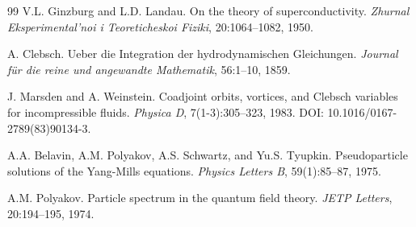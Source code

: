\documentclass[11pt,a4paper]{article}
\begin{document}
\begin{thebibliography}{99}
	V.L. Ginzburg and L.D. Landau.
	\newblock On the theory of superconductivity.
	\newblock \textit{Zhurnal Eksperimental'noi i Teoreticheskoi Fiziki}, 20:1064--1082, 1950.
	
	A. Clebsch.
	\newblock Ueber die Integration der hydrodynamischen Gleichungen.
	\newblock \textit{Journal für die reine und angewandte Mathematik}, 56:1--10, 1859.
	
	J. Marsden and A. Weinstein.
	\newblock Coadjoint orbits, vortices, and Clebsch variables for incompressible fluids.
	\newblock \textit{Physica D}, 7(1-3):305--323, 1983.
	\newblock DOI: 10.1016/0167-2789(83)90134-3.
	
	A.A. Belavin, A.M. Polyakov, A.S. Schwartz, and Yu.S. Tyupkin.
	\newblock Pseudoparticle solutions of the Yang-Mills equations.
	\newblock \textit{Physics Letters B}, 59(1):85--87, 1975.
	
	A.M. Polyakov.
	\newblock Particle spectrum in the quantum field theory.
	\newblock \textit{JETP Letters}, 20:194--195, 1974.
	
\end{thebibliography}
	
\end{document}

